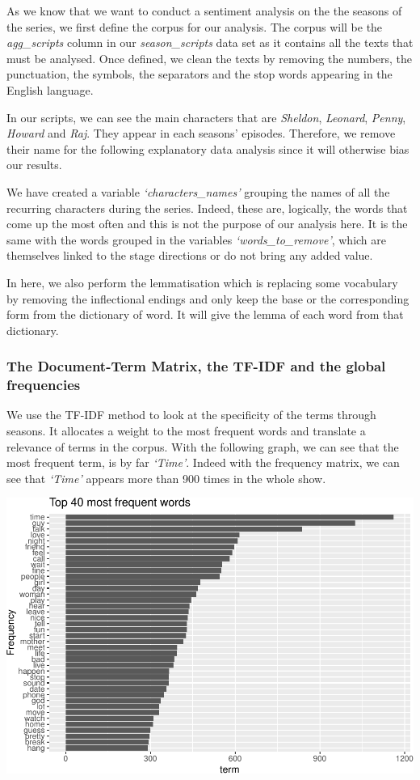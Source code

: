 \documentclass[
]{article}
\begin{document}
As we know that we want to conduct a sentiment analysis on the the
seasons of the series, we first define the corpus for our analysis. The
corpus will be the \emph{agg\_scripts} column in our
\emph{season\_scripts} data set as it contains all the texts that must
be analysed. Once defined, we clean the texts by removing the numbers,
the punctuation, the symbols, the separators and the stop words
appearing in the English language.

In our scripts, we can see the main characters that are \emph{Sheldon},
\emph{Leonard}, \emph{Penny}, \emph{Howard} and \emph{Raj}. They appear
in each seasons' episodes. Therefore, we remove their name for the
following explanatory data analysis since it will otherwise bias our
results.

We have created a variable \emph{`characters\_names'} grouping the names
of all the recurring characters during the series. Indeed, these are,
logically, the words that come up the most often and this is not the
purpose of our analysis here. It is the same with the words grouped in
the variables \emph{`words\_to\_remove'}, which are themselves linked to
the stage directions or do not bring any added value.

In here, we also perform the lemmatisation which is replacing some
vocabulary by removing the inflectional endings and only keep the base
or the corresponding form from the dictionary of word. It will give the
lemma of each word from that dictionary.

\hypertarget{the-document-term-matrix-the-tf-idf-and-the-global-frequencies}{%
\subsubsection{The Document-Term Matrix, the TF-IDF and the global
frequencies}\label{the-document-term-matrix-the-tf-idf-and-the-global-frequencies}}

We use the TF-IDF method to look at the specificity of the terms through
seasons. It allocates a weight to the most frequent words and translate
a relevance of terms in the corpus. With the following graph, we can see
that the most frequent term, is by far \emph{`Time'}. Indeed with the
frequency matrix, we can see that \emph{`Time'} appears more than 900
times in the whole show.

\includegraphics{report_files/figure-latex/unnamed-chunk-15-1.pdf}
\end{document}
